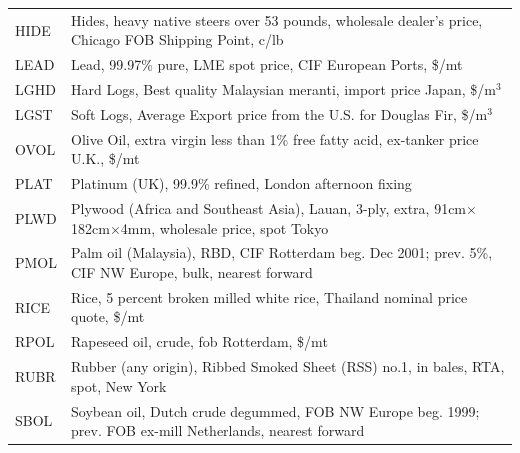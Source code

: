 \documentclass[11pt]{article}
\begin{document}
\begin{table}[H]
\begin{tabular*}{1.0\textwidth}{@{\extracolsep{\linewidth minus\linewidth}}>{\ttfamily}lp{5.75in}}
		HIDE	&	Hides, heavy native steers over 53 pounds, wholesale dealer's price, Chicago FOB Shipping Point, c/lb	\\
		LEAD	&	Lead, 99.97\% pure, LME spot price, CIF European Ports, \$/mt	\\
		LGHD	&	Hard Logs, Best quality Malaysian meranti, import price Japan, \$/m$^3$	\\
		LGST	&	Soft Logs, Average Export price from the U.S. for Douglas Fir, \$/m$^3$	\\
		OVOL	&	Olive Oil, extra virgin less than 1\% free fatty acid, ex-tanker price U.K., \$/mt	\\
		PLAT	&	Platinum (UK), 99.9\% refined, London afternoon fixing	\\
		PLWD	&	Plywood (Africa and Southeast Asia), Lauan, 3-ply, extra, 91cm$\times$182cm$\times$4mm,  wholesale price, spot Tokyo	\\
		PMOL	&	Palm oil (Malaysia), RBD, CIF Rotterdam beg. Dec 2001; prev. 5\%, CIF NW Europe, bulk, nearest forward	\\
		RICE	&	Rice, 5 percent broken milled white rice, Thailand nominal price quote, \$/mt	\\
		RPOL	&	Rapeseed oil, crude, fob Rotterdam, \$/mt	\\
		RUBR	&	Rubber (any origin), Ribbed Smoked Sheet (RSS) no.1, in bales, RTA, spot, New York	\\
		SBOL	&	Soybean oil, Dutch crude degummed, FOB NW Europe beg. 1999; prev. FOB ex-mill Netherlands, nearest forward	\\

\end{tabular*}
\end{table}
\end{document}
